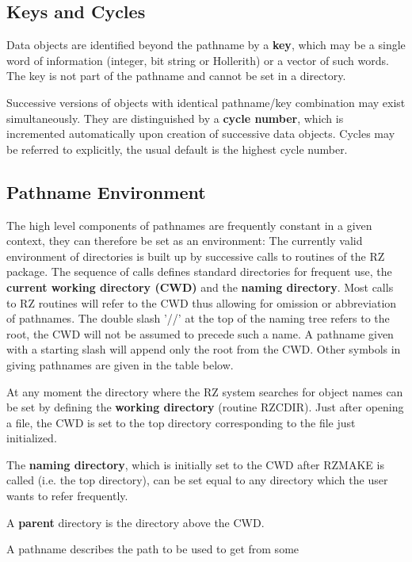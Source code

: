 \subsection{Keys and Cycles}
\par Data objects are identified beyond the pathname by a {\bf key},
which may be a single word of information
(integer, bit string or Hollerith)
or a vector of such words. The key is not part of the pathname and cannot
be set in a directory.
\par Successive versions of objects with identical
pathname/key combination may exist simultaneously.
They are distinguished by a {\bf cycle number},
which is incremented automatically upon creation of successive data
objects. Cycles may be referred to explicitly,
the usual default is the highest cycle number.
\subsection{Pathname Environment}
\par The high level components of pathnames are
frequently constant in a given context,
they can therefore be set as an environment:
\newline
The currently valid environment of directories is built up by successive
calls to routines of the RZ package. The sequence of calls defines
standard directories for frequent use, the
{\bf current working directory (CWD)}
and the {\bf naming directory}.
Most calls to RZ routines will refer to the CWD
thus allowing for omission or abbreviation of pathnames.
The double slash '//' at the top of the naming tree refers to the root,
the CWD will not be assumed to precede such a name.
A pathname given with a starting slash will append only the root from the
CWD. Other symbols in giving pathnames are given in the table below.
\par At any moment the directory where the RZ system searches for object
names can be set by defining the {\bf working directory}
(routine RZCDIR). Just after opening a file,
the CWD is set to the top directory corresponding to the
file just initialized.
\par The {\bf naming directory}, which is initially set to the CWD
after RZMAKE is called (i.e. the top directory),
can be set equal to any directory
which the user wants to refer frequently.
\par A {\bf parent} directory is the directory above the CWD.
\par A pathname describes the path to be used to get from some

